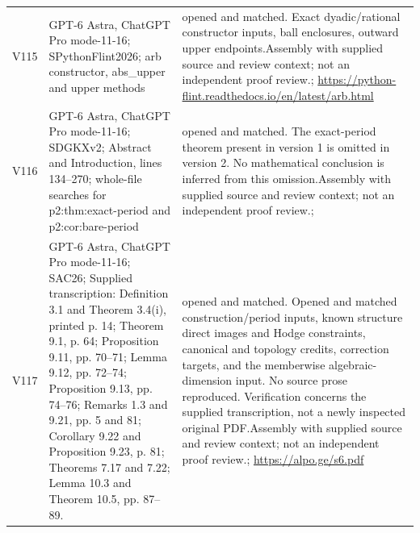 \documentclass[11pt,a4paper]{article}
\theoremstyle{plain}
\theoremstyle{definition}
\begin{document}
\begin{longtable}{@{}L{.08\linewidth}L{.31\linewidth}L{.56\linewidth}@{}}
V115 & GPT-6 Astra, ChatGPT Pro mode-11-16; S\newline PythonFlint2026; arb constructor, abs\_\allowbreak{}upper and upper methods & opened and matched. Exact dyadic/\allowbreak{}rational constructor inputs, ball enclosures, outward upper endpoints.\newline Assembly with supplied source and review context; not an independent proof review.\newline {}; \url{https://python-flint.readthedocs.io/en/latest/arb.html}\\
V116 & GPT-6 Astra, ChatGPT Pro mode-11-16; S\newline DGKXv2; Abstract and Introduction, lines 134--270; whole-file searches for p2:\allowbreak{}thm:\allowbreak{}exact-period and p2:\allowbreak{}cor:\allowbreak{}bare-period & opened and matched. The exact-period theorem present in version 1 is omitted in version 2. No mathematical conclusion is inferred from this omission.\newline Assembly with supplied source and review context; not an independent proof review.\newline {}; \\
V117 & GPT-6 Astra, ChatGPT Pro mode-11-16; S\newline AC26; Supplied transcription:\allowbreak{} Definition 3.1 and Theorem 3.4(i), printed p. 14; Theorem 9.1, p. 64; Proposition 9.11, pp. 70--71; Lemma 9.12, pp. 72--74; Proposition 9.13, pp. 74--76; Remarks 1.3 and 9.21, pp. 5 and 81; Corollary 9.22 and Proposition 9.23, p. 81; Theorems 7.17 and 7.22; Lemma 10.3 and Theorem 10.5, pp. 87--89. & opened and matched. Opened and matched construction/\allowbreak{}period inputs, known structure direct images and Hodge constraints, canonical and topology credits, correction targets, and the memberwise algebraic-dimension input. No source prose reproduced. Verification concerns the supplied transcription, not a newly inspected original PDF.\newline Assembly with supplied source and review context; not an independent proof review.\newline {}; \url{https://alpo.ge/s6.pdf}\\

\end{longtable}
\end{document}
